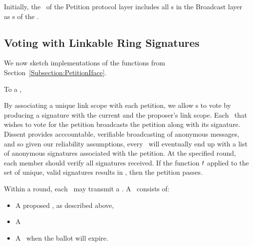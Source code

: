 %
Initially, the \KwManifest~of the Petition protocol layer includes all \KwNode s
in the Broadcast layer as \KwMember s of the \KwCluster.

\subsection{Voting with Linkable Ring Signatures}
We now sketch implementations of the functions from
Section~\ref{Subsection:PetitionIface}.

To \NamePropose a \StructPetition,

By associating a unique link scope with each petition, we allow \KwMember s
to vote by producing a signature with the current \KwRoster and the proposer's
link scope. Each \KwMember~that wishes to vote for the petition broadcasts
the petition along with its signature. Dissent provides acccountable, verifiable
broadcasting of anonymous messages, and so given our reliability assumptions,
every \KwMember~will eventually end up with a list of anonymous signatures
associated with the petition. At the specified round, each member should verify
all signatures received. If the function $t$ applied to the set of unique, valid
signatures results in \AtomTrue, then the petition passes.

Within a round, each \KwMember~may  transmit a \KwPetition. A
\KwPetition~consists of:
\begin{itemize}
  \item A proposed \KwManifest, as described above,
  \item A \KwLinkScope{}
  \item A \KwRound~when the ballot will expire.
\end{itemize}

